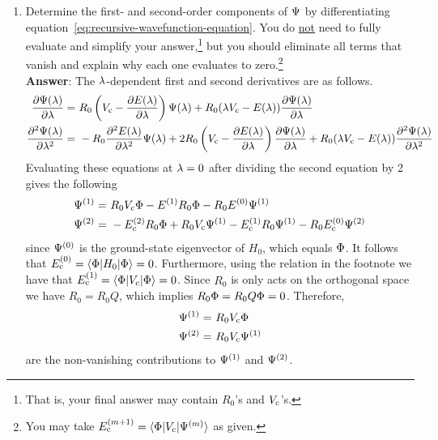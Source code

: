 \documentclass[11pt]{article}
\begin{document}
\begin{enumerate}
\newpage
\item
Determine the first- and second-order components of $\Psi $ by differentiating equation~\ref{eq:recursive-wavefunction-equation}.
You do \ul{not} need to fully evaluate and simplify your answer,\footnote{That is, your final answer may contain $R_0$'s and $V_{\mathrm{c}}$'s.} but you should eliminate all terms that vanish and explain why each one evaluates to zero.\footnote{You may take $E_{\mathrm{c}}^{(m+1)}=\langle\Phi |V_{\mathrm{c}}|\Psi ^{(m)}\rangle$ as given.}\\[10pt]
\textbf{Answer}:
The $\lambda $-dependent first and second derivatives are as follows.
\begin{align*}
  \frac {\partial\Psi (\lambda )}{\partial\lambda }
=&\
  R_0
  \left(
    V_{\mathrm{c}}
  -
    \frac {\partial E(\lambda )}{\partial\lambda }
  \right)
  \Psi (\lambda )
+
  R_0
  (
    \lambda 
    V_{\mathrm{c}}
  -
    E(\lambda )
  )
  \frac {\partial\Psi (\lambda )}{\partial\lambda }
\\
  \frac {\partial^2\Psi (\lambda )}{\partial\lambda ^2}
=&\
-
  R_0
  \frac {\partial^2E(\lambda )}{\partial\lambda ^2}
  \Psi (\lambda )
+
  2
  R_0
  \left(
    V_{\mathrm{c}}
  -
    \frac {\partial E(\lambda )}{\partial\lambda }
  \right)
  \frac {\partial\Psi (\lambda )}{\partial\lambda }
+
  R_0
  (
    \lambda 
    V_{\mathrm{c}}
  -
    E(\lambda )
  )
  \frac {\partial^2\Psi (\lambda )}{\partial\lambda ^2}
\end{align*}
Evaluating these equations at $\lambda =0$ after dividing the second equation by 2 gives the following
\begin{align*}
  \Psi ^{(1)}
=&\
  R_0
  V_{\mathrm{c}}
  \Phi 
-
  E^{(1)}
  R_0 
  \Phi 
-
  R_0
  E^{(0)}
  \Psi ^{(1)}
\\
  \Psi ^{(2)}
=&\
-
  E_{\mathrm{c}}^{(2)}
  R_0
  \Phi 
+
  R_0
  V_{\mathrm{c}}
  \Psi ^{(1)}
-
  E_{\mathrm{c}}^{(1)}
  R_0
  \Psi ^{(1)}
-
  R_0
  E_{\mathrm{c}}^{(0)}
  \Psi ^{(2)}
\end{align*}
since $\Psi ^{(0)}$ is the ground-state eigenvector of $H_0$, which equals $\Phi $.
It follows that
$
  E_{\mathrm{c}}^{(0)}
=
  \langle\Phi |H_0|\Phi \rangle
=
  0
$.
Furthermore, using the relation in the footnote we have that
$
  E_{\mathrm{c}}^{(1)}
=
  \langle\Phi |V_{\mathrm{c}}|\Phi \rangle
=
  0
$.
Since $R_0$ is only acts on the orthogonal space we have $R_0=R_0Q$, which implies
$
  R_0
  \Phi 
=
  R_0
  Q
  \Phi 
=
  0
$.
Therefore,
\begin{align*}
  \Psi ^{(1)}
=&\
  R_0
  V_{\mathrm{c}}
  \Phi 
\\
  \Psi ^{(2)}
=&\
  R_0
  V_{\mathrm{c}}
  \Psi ^{(1)}
\end{align*}
are the non-vanishing contributions to $\Psi ^{(1)}$ and $\Psi ^{(2)}$.


\end{enumerate}
\end{document}
